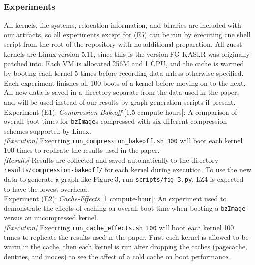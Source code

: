 \documentclass[sigplan,twocolumn]{acmart}
\begin{document}
{\subsubsection{Experiments}
All kernels, file systems, relocation information, and binaries are included
with our artifacts, so all experiments except for (E5) can be run
by executing one shell script from the root of the repository with no
additional preparation. All guest kernels are Linux version 5.11, since this is the version FG-KASLR was originally 
patched into.
Each VM is allocated 256M and 1 CPU, and
the cache is warmed by booting each kernel 5 times before recording data unless otherwise
specified. Each experiment finishes all 100 boots of a kernel before moving on to the next.
All new data is saved in a directory separate
from the data used in the paper, and will be used instead of our results
by graph generation scripts if present. 
~\\

Experiment (E1): \textit{Compression Bakeoff} [1.5 compute-hours]: 
A comparison of overall boot times for \texttt{bzImage}s compressed
with six different compression schemes supported by Linux. 
~\\

\textit{[Execution]}
Executing \texttt{run\_compression\_bakeoff.sh 100} will
boot each kernel 100 times to replicate the results used in the paper.
\\

\textit{[Results]}
Results are collected and saved automatically to the directory \texttt{results/compression-bakeoff/} for each kernel during execution. To use the new data to generate 
a graph like Figure 3, run \texttt{scripts/fig-3.py}. LZ4 is expected to
have the lowest overhead. 
~\\

Experiment (E2): \textit{Cache-Effects} [1 compute-hour]: 
An experiment used to demonstrate the effects of caching on overall boot time
when booting a \texttt{bzImage} versus an uncompressed kernel. 
~\\

\textit{[Execution]}
Executing \texttt{run\_cache\_effects.sh 100} will
boot each kernel 100 times to replicate the results used in the paper. First each kernel is allowed to be warm in the cache, then
each kernel is run after dropping the caches (pagecache, dentries, and inodes) to see the affect of a cold cache on boot performance.
\\

}
\end{document}

